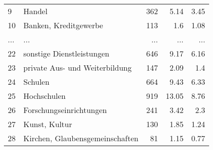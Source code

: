 \begin{longtable}{lXrrr}
        9 & \multicolumn{1}{X}{Handel} & %
          \num{362} &
          \num[round-mode=places,round-precision=2]{5.14} &
          \num[round-mode=places,round-precision=2]{3.45} \\
        10 & \multicolumn{1}{X}{Banken, Kreditgewerbe} & %
          \num{113} &
          \num[round-mode=places,round-precision=2]{1.6} &
          \num[round-mode=places,round-precision=2]{1.08} \\
       ... & ... & ... & ... & ... \\
        22 & \multicolumn{1}{X}{sonstige Dienstleistungen} & %
          \num{646} &
          \num[round-mode=places,round-precision=2]{9.17} &
          \num[round-mode=places,round-precision=2]{6.16} \\

        23 & \multicolumn{1}{X}{private Aus- und Weiterbildung} & %
          \num{147} &
          \num[round-mode=places,round-precision=2]{2.09} &
          \num[round-mode=places,round-precision=2]{1.4} \\

        24 & \multicolumn{1}{X}{Schulen} & %
          \num{664} &
          \num[round-mode=places,round-precision=2]{9.43} &
          \num[round-mode=places,round-precision=2]{6.33} \\

        25 & \multicolumn{1}{X}{Hochschulen} & %
          \num{919} &
          \num[round-mode=places,round-precision=2]{13.05} &
          \num[round-mode=places,round-precision=2]{8.76} \\

        26 & \multicolumn{1}{X}{Forschungseinrichtungen} & %
          \num{241} &
          \num[round-mode=places,round-precision=2]{3.42} &
          \num[round-mode=places,round-precision=2]{2.3} \\

        27 & \multicolumn{1}{X}{Kunst, Kultur} & %
          \num{130} &
          \num[round-mode=places,round-precision=2]{1.85} &
          \num[round-mode=places,round-precision=2]{1.24} \\

        28 & \multicolumn{1}{X}{Kirchen, Glaubensgemeinschaften} & %
          \num{81} &
          \num[round-mode=places,round-precision=2]{1.15} &
          \num[round-mode=places,round-precision=2]{0.77} \\


\end{longtable}
